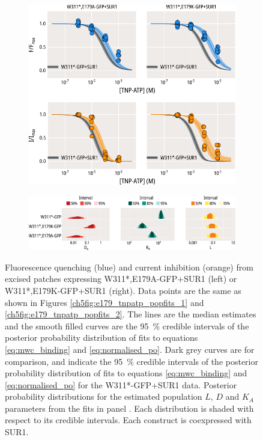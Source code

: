 \begin{figure}[hbtp]
	\centering
	\begin{subfigure}[t]{0.9\textwidth}
		\caption{}\label{ch5fig:mwc_e179_1}
		\centering
		\includegraphics[width=\textwidth]{mwc_e179_1.pdf}
	\end{subfigure}
	\vfill
	\begin{subfigure}[t]{0.9\textwidth}
		\caption{}\label{ch5fig:mwc_e179_2}
		\centering
		\includegraphics[width=\textwidth]{mwc_e179_2.pdf}
	\end{subfigure}
	\caption[E179 mutations affect gating and nucleotide binding]{
	 Fluorescence quenching (blue) and current inhibition (orange) from excised patches expressing W311*,E179A-GFP+SUR1 (left) or W311*,E179K-GFP+SUR1 (right).
	Data points are the same as shown in Figures \ref{ch5fig:e179_tnpatp_popfits_1} and \ref{ch5fig:e179_tnpatp_popfits_2}.
	The lines are the median estimates and the smooth filled curves are the \SI{95}{\percent} credible intervals of the posterior probability distribution of fits to equations \ref{eq:mwc_binding} and \ref{eq:normalised_po}.
	Dark grey curves are for comparison, and indicate the \SI{95}{\percent} credible intervals of the posterior probability distribution of fits to equations \ref{eq:mwc_binding} and \ref{eq:normalised_po} for the W311*-GFP+SUR1 data.
	 Posterior probability distributions for the estimated population $L$, $D$ and $K_A$ parameters from the fits in panel .
	Each distribution is shaded with respect to its credible intervals.
	Each construct is coexpressed with SUR1.
	}\label{ch5fig:e179_2}
\end{figure}


